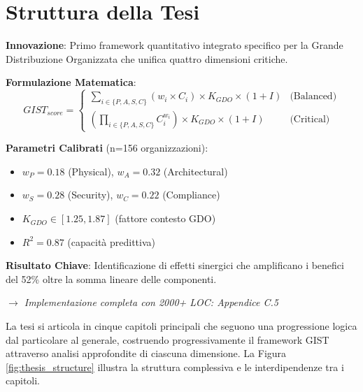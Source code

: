 \section{Struttura della Tesi}
\begin{tcolorbox}[
    colback=blue!5!white,
    colframe=blue!75!black,
    title={\textbf{Innovation Box 1.1:} Framework GIST - Contributo Metodologico Principale},
    fonttitle=\bfseries,
    boxrule=1.5pt,
    arc=2mm,
    breakable
]
\textbf{Innovazione}: Primo framework quantitativo integrato specifico per la Grande Distribuzione Organizzata che unifica quattro dimensioni critiche.

\vspace{0.3cm}
\textbf{Formulazione Matematica}:
\begin{equation*}
GIST_{score} = \begin{cases}
\sum_{i \in \{P,A,S,C\}} (w_i \times C_i) \times K_{GDO} \times (1+I) & \text{(Balanced)} \\
\left(\prod_{i \in \{P,A,S,C\}} C_i^{w_i}\right) \times K_{GDO} \times (1+I) & \text{(Critical)}
\end{cases}
\end{equation*}

\vspace{0.3cm}
\textbf{Parametri Calibrati} (n=156 organizzazioni):
\begin{itemize}[topsep=0pt,itemsep=2pt]
    \item $w_P = 0.18$ (Physical), $w_A = 0.32$ (Architectural)
    \item $w_S = 0.28$ (Security), $w_C = 0.22$ (Compliance)
    \item $K_{GDO} \in [1.25, 1.87]$ (fattore contesto GDO)
    \item $R^2 = 0.87$ (capacità predittiva)
\end{itemize}

\vspace{0.3cm}
\textbf{Risultato Chiave}: Identificazione di effetti sinergici che amplificano i benefici del 52\% oltre la somma lineare delle componenti.

\vspace{0.2cm}
\textit{$\rightarrow$ Implementazione completa con 2000+ LOC: Appendice C.5}
\end{tcolorbox}

La tesi si articola in cinque capitoli principali che seguono una progressione logica dal particolare al generale, costruendo progressivamente il framework GIST attraverso analisi approfondite di ciascuna dimensione. La Figura \ref{fig:thesis_structure} illustra la struttura complessiva e le interdipendenze tra i capitoli.

